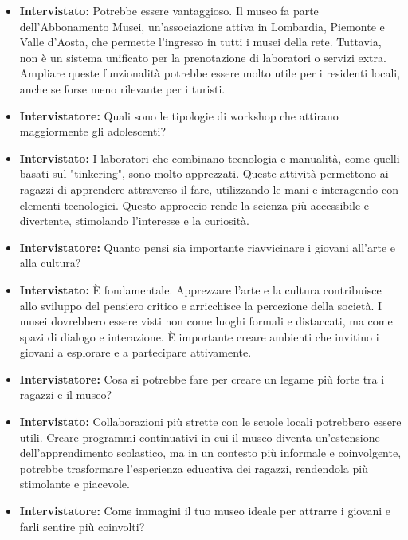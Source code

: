 \documentclass{article}
\begin{document}
\begin{itemize}
    \item \textbf{Intervistato:} Potrebbe essere vantaggioso. Il museo fa parte dell'Abbonamento Musei, un'associazione attiva in Lombardia, Piemonte e Valle d'Aosta, che permette l'ingresso in tutti i musei della rete. Tuttavia, non è un sistema unificato per la prenotazione di laboratori o servizi extra. Ampliare queste funzionalità potrebbe essere molto utile per i residenti locali, anche se forse meno rilevante per i turisti.
    
    \item \textbf{Intervistatore:} Quali sono le tipologie di workshop che attirano maggiormente gli adolescenti?
    
    \item \textbf{Intervistato:} I laboratori che combinano tecnologia e manualità, come quelli basati sul "tinkering", sono molto apprezzati. Queste attività permettono ai ragazzi di apprendere attraverso il fare, utilizzando le mani e interagendo con elementi tecnologici. Questo approccio rende la scienza più accessibile e divertente, stimolando l'interesse e la curiosità.
    
    \item \textbf{Intervistatore:} Quanto pensi sia importante riavvicinare i giovani all'arte e alla cultura?
    
    \item \textbf{Intervistato:} È fondamentale. Apprezzare l'arte e la cultura contribuisce allo sviluppo del pensiero critico e arricchisce la percezione della società. I musei dovrebbero essere visti non come luoghi formali e distaccati, ma come spazi di dialogo e interazione. È importante creare ambienti che invitino i giovani a esplorare e a partecipare attivamente.
    
    \item \textbf{Intervistatore:} Cosa si potrebbe fare per creare un legame più forte tra i ragazzi e il museo?
    
    \item \textbf{Intervistato:} Collaborazioni più strette con le scuole locali potrebbero essere utili. Creare programmi continuativi in cui il museo diventa un'estensione dell'apprendimento scolastico, ma in un contesto più informale e coinvolgente, potrebbe trasformare l'esperienza educativa dei ragazzi, rendendola più stimolante e piacevole.
    
    \item \textbf{Intervistatore:} Come immagini il tuo museo ideale per attrarre i giovani e farli sentire più coinvolti?
    

\end{itemize}
\end{document}
